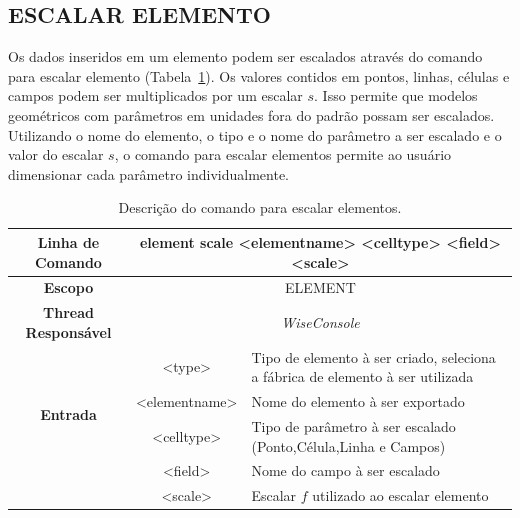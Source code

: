 \subsection{ESCALAR ELEMENTO}\label{sec:scale_element}

Os dados inseridos em um elemento podem ser escalados através do comando para escalar elemento (Tabela~\ref{tab:scale_element}). Os valores contidos em pontos, linhas, células e campos podem ser multiplicados por um escalar $s$. Isso permite que modelos geométricos com parâmetros em unidades fora do padrão possam ser escalados. Utilizando o nome do elemento, o tipo e o nome do parâmetro a ser escalado e o valor do escalar $s$, o comando para escalar elementos permite ao usuário dimensionar cada parâmetro individualmente.

\begin{center}
	\begin{table}[!htbp]
		\begin{tabularx}{\textwidth}{c|c|X}
			\toprule
			\textbf{Linha de Comando} & \multicolumn{2}{c}{element scale <element\underline{\space\space}name> <cell\underline{\space\space}type> <field> <scale>} \\
			\midrule
			\textbf{Escopo} & \multicolumn{2}{c}{ELEMENT} \\
			\hline
			\textbf{Thread Responsável} & \multicolumn{2}{c}{\textit{WiseConsole}} \\
			\hline
			\multirow{4}{*}{\textbf{Entrada}} & <type> & Tipo de elemento à ser criado, seleciona a fábrica de elemento à ser utilizada \\
			
			& <element\underline{\space\space}name> & Nome do elemento à ser exportado \\
			& <cell\underline{\space\space}type> & Tipo de parâmetro à ser escalado (Ponto,Célula,Linha e Campos) \\
			& <field> & Nome do campo à ser escalado \\
			& <scale> & Escalar $f$ utilizado ao escalar elemento \\
			\bottomrule
		\end{tabularx}
		\caption{Descrição do comando para escalar elementos.}
		\label{tab:scale_element}
	\end{table}
\end{center}

